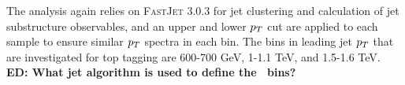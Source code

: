 The analysis again relies on \textsc{FastJet} 3.0.3 for jet clustering and
calculation of jet substructure observables, and an upper and lower $p_T$ cut are applied
to each sample to ensure similar $p_T$ spectra in each bin. The bins in leading jet $p_T$
that are investigated for top tagging are 600-700 GeV, 1-1.1 TeV, and
1.5-1.6 TeV. {\bf ED: What jet algorithm is used to define the \pt~bins?}